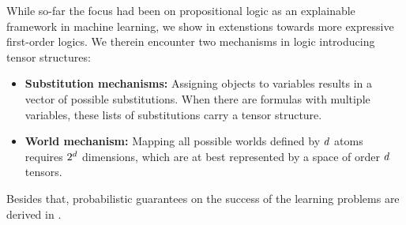 

While so-far the focus had been on propositional logic as an explainable framework in machine learning, we show in  extenstions towards more expressive first-order logics.
We therein encounter two mechanisms in logic introducing tensor structures:
\begin{itemize}
    \item \textbf{Substitution mechanisms:} Assigning objects to variables results in a vector of possible substitutions. When there are formulas with multiple variables, these lists of substitutions carry a tensor structure.
    \item \textbf{World mechanism:} Mapping all possible worlds defined by $d$ atoms requires $2^{d}$ dimensions, which are at best represented by a space of order $d$ tensors.
\end{itemize}


Besides that, probabilistic guarantees on the success of the learning problems are derived in .